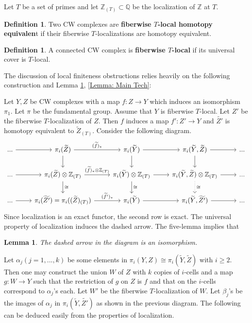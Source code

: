 \documentclass[11pt]{amsart}
\newtheorem{lemma}[theorem]{Lemma}
\theoremstyle{definition}
\newtheorem{definition}[theorem]{Definition}
\numberwithin{equation}{section}
\numberwithin{equation}{section}
\newcommand\QQ{\mathbb{Q}}
\newcommand\ZZ{\mathbb{Z}}
\begin{document}
Let $T$ be a set of primes and let $\ZZ_{(T)}\subset \QQ$ be the localization of $\ZZ$ at $T$. 

\begin{definition}
Two CW complexes are \textbf{fiberwise $T$-local homotopy equivalen}t if their fiberwise $T$-localizations are homotopy equivalent.
\end{definition}

\begin{definition}
A connected CW complex is \textbf{fiberwise $T$-local} if its universal cover is $T$-local.
\end{definition}

The discussion of local finiteness obstructions relies heavily on the following construction and Lemma \ref{Lemma: Localization on homotopy groups}, \ref{Lemma: Main Tech}:

Let $Y,Z$ be CW complexes with a map $f:Z\rightarrow Y$ which induces an isomorphism $\pi_1$. Let $\pi$ be the fundamental group. Assume that $Y$ is fiberwise $T$-local. Let $Z'$ be the fiberwise $T$-localization of $Z$. Then $f$ induces a map $f':Z'\rightarrow Y$ and $\widetilde{Z'}$ is homotopy equivalent to $\widetilde{Z}_{(T)}$. Consider the following diagram.
\[
\begin{tikzcd}
  ... \arrow[r] & \pi_{i}(\widetilde{Z}) \arrow[r,"(\widetilde{f})_*"] \arrow[d] & \pi_{i}(\widetilde{Y}) \arrow[r] \arrow[d,] & \pi_{i}(\widetilde{Y},\widetilde{Z}) \arrow[r] \arrow[d] & ... \\
  ... \arrow[r] & \pi_{i}(\widetilde{Z})\otimes \ZZ_{(T)} \arrow[r,"(\widetilde{f})_{*}\otimes \ZZ_{(T)}"] \arrow[d,"\cong"] & \pi_{i}(\widetilde{Y})\otimes \ZZ_{(T)} \arrow[r] \arrow[d,"\cong"] & \pi_{i}(\widetilde{Y},\widetilde{Z})\otimes \ZZ_{(T)} \arrow[r] \arrow[d,dotted,"\cong"] & ... \\  
  ... \arrow[r] & \pi_{i}(\widetilde{Z'})=\pi_{i}((\widetilde{Z})_{(T)}) \arrow[r,"(\widetilde{f'})_{*}"] & \pi_{i}(\widetilde{Y}) \arrow[r] & \pi_{i}(\widetilde{Y},\widetilde{Z'}) \arrow[r] &  ...
\end{tikzcd}
\]
Since localization is an exact functor, the second row is exact. The universal property of localization induces the dashed arrow. The five-lemma implies that 

\begin{lemma}\label{Lemma: Localization on homotopy groups}
The dashed arrow in the diagram is an isomorphism.    
\end{lemma}

Let $\alpha_j(j=1,...,k)$ be some elements in $\pi_i(Y,Z)\cong \pi_i(\widetilde{Y},\widetilde{Z})$ with $i\geq 2$. Then one may construct the union $W$ of $Z$ with $k$ copies of $i$-cells and a map $g:W\rightarrow Y$ such that the restriction of $g$ on $Z$ is $f$ and that on the $i$-cells correspond to $\alpha_j$'s each. Let $W'$ be the fiberwise $T$-localization of $W$. Let $\beta_j$'s be the images of $\alpha_j$ in $\pi_{i}(\widetilde{Y},\widetilde{Z'})$ as shown in the previous diagram. The following can be deduced easily from the properties of localization. 
\end{document}
